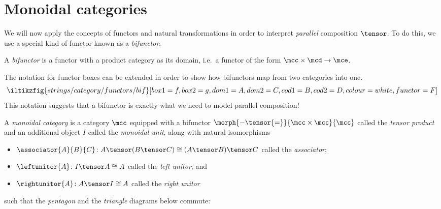 \section{Monoidal categories}

We will now apply the concepts of functors and natural transformations in order
to interpret \emph{parallel} composition \(\tensor\).
To do this, we use a special kind of functor known as a \emph{bifunctor}.

\begin{definition}[Bifunctor]
    A \emph{bifunctor} is a functor with a product category as its domain, i.e.\
    a functor of the form \(\mcc \times \mcd \to \mce\).
\end{definition}

The notation for functor boxes can be extended in order to show how bifunctors
map from two categories into one.
\[
    \iltikzfig{strings/category/functors/bif}[box1=f,box2=g,dom1=A,dom2=C,cod1=B,cod2=D,colour=white,functor=F]
\]
This notation suggests that a bifunctor is exactly what we need to model
parallel composition!

\begin{definition}
    \label{def:monoidal-category}
    A \emph{monoidal category} is a category \(\mcc\) equipped with a
    bifunctor \(\morph{{-} \tensor {=}}{\mcc \times \mcc}{\mcc}\) called the
    \emph{tensor product} and an additional object \(I\) called the
    \emph{monoidal unit},
    along with natural isomorphisms
    \begin{itemize}
        \item \(
            \associator{A}{B}{C}
            \colon
            A \tensor (B \tensor C)
            \cong
            (A \tensor B) \tensor C
            \) called the \emph{associator};
        \item \(
            \leftunitor{A}
            \colon
            I \tensor A
            \cong
            A
            \) called the \emph{left unitor}; and
        \item \(
            \rightunitor{A}
            \colon
            A \tensor I
            \cong
            A
            \) called the \emph{right unitor}
    \end{itemize}
    such that the \emph{pentagon} and the \emph{triangle} diagrams below
    commute:
    \begin{center}
        

        \vspace{1em}

        
    \end{center}
\end{definition}

